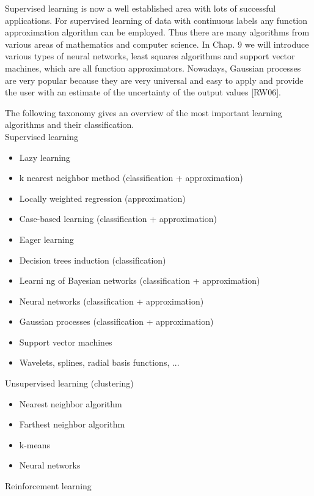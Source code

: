 \documentclass[10pt]{article}
\begin{document}
Supervised learning is now a well established area with lots of successful applications. For supervised learning of data with continuous labels any function approximation algorithm can be employed. Thus there are many algorithms from various areas of mathematics and computer science. In Chap. 9 we will introduce various types of neural networks, least squares algorithms and support vector machines, which are all function approximators. Nowadays, Gaussian processes are very popular because they are very universal and easy to apply and provide the user with an estimate of the uncertainty of the output values [RW06].

The following taxonomy gives an overview of the most important learning algorithms and their classification.\\
Supervised learning

\begin{itemize}
  \item Lazy learning
  \item k nearest neighbor method (classification + approximation)
  \item Locally weighted regression (approximation)
  \item Case-based learning (classification + approximation)
  \item Eager learning
  \item Decision trees induction (classification)
  \item Learni
ng of Bayesian networks (classification + approximation)
  \item Neural networks (classification + approximation)
  \item Gaussian processes (classification + approximation)
  \item Support vector machines
  \item Wavelets, splines, radial basis functions, ...
\end{itemize}

Unsupervised learning (clustering)

\begin{itemize}
  \item Nearest neighbor algorithm
  \item Farthest neighbor algorithm
  \item k-means
  \item Neural networks
\end{itemize}

Reinforcement learning
\end{document}
